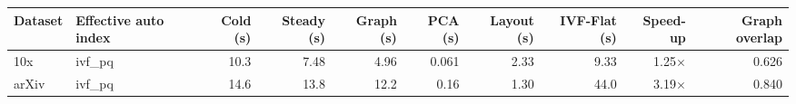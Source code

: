 \begin{tabular}{@{}llrrrrrrrr@{}}
\toprule
Dataset & Effective auto index & Cold (s) & Steady (s) & Graph (s) & PCA (s) & Layout (s) & IVF-Flat (s) & Speed-up & Graph overlap \\
\midrule
10x & ivf\_pq & 10.3 & 7.48 & 4.96 & 0.061 & 2.33 & 9.33 & 1.25$\times$ & 0.626 \\
arXiv & ivf\_pq & 14.6 & 13.8 & 12.2 & 0.16 & 1.30 & 44.0 & 3.19$\times$ & 0.840 \\
\bottomrule
\end{tabular}
